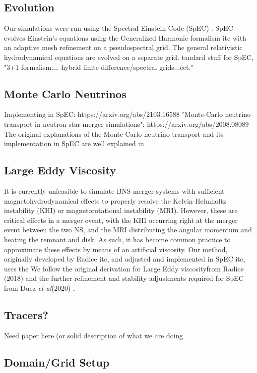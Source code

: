 \documentclass[%
twocolumn,
superscriptaddress,
nofootinbib,
 amsmath,amssymb,
 aps, prd
]{revtex4-2}
\newcommand{\alex}[1]{\color{red}{#1}}
\newcommand{\etal}[0]{\textit{et al}}
\newcommand{\lev}[0]{Large Eddy viscosity}
\begin{document}
  \subsection{Evolution}
      Our simulations were run using the Spectral Einstein Code (SpEC) \cite{spec}.
      SpEC evolves Einstein's equations using the Generalized Harmonic formalism {\alex cite} with an adaptive mesh refinement on a pseudospectral grid.
      The general relativistic hydrodynamical equations are evolved on a separate grid.
      {\alex Standard stuff for SpEC, "3+1 formalism.... hybrid finite difference/spectral grids...ect."}
      
  \subsection{Monte Carlo Neutrinos}
      Implementing in SpEC: https://arxiv.org/abs/2103.16588
      "Monte-Carlo neutrino transport in neutron star merger simulations": https://arxiv.org/abs/2008.08089
      The original explanations of the Monte-Carlo neutrino transport and its implementation in SpEC are well explained in 
    \subsection{Large Eddy Viscosity}
    It is currently unfeasible to simulate BNS merger systems with sufficient magnetohydrodynamical effects to properly resolve the Kelvin-Helmholtz instability (KHI) or magnetorotational instability (MRI).
    However, these are critical effects in a merger event, with the KHI occurring right at the merger event between the two NS, and the MRI distributing the angular momentum and heating the remnant and disk.
    As such, it has become common practice to approximate these effects by means of an artificial viscosity.
    Our method, originally developed by Radice {\alex cite}, and adjusted and implemented in SpEC {\alex cite}, uses the 
      We follow the original derivation for \lev from Radice (2018) \cite{Radice_2018} and the further refinement and stability adjustments required for SpEC from Duez \etal (2020) \cite{Duez_2020}.



    

  \subsection{Tracers?}
      Need paper here (or solid description of what we are doing
  \subsection{Domain/Grid Setup}
\end{document}
